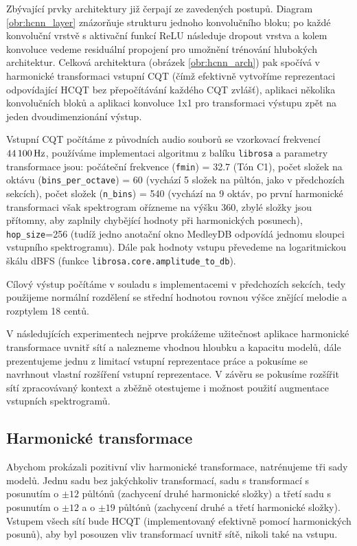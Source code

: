 Zbývající prvky architektury již čerpají ze zavedených postupů. Diagram \ref{obr:hcnn_layer} znázorňuje strukturu jednoho konvolučního bloku; po každé konvoluční vrstvě s aktivační funkcí ReLU následuje dropout vrstva a kolem konvoluce vedeme residuální propojení pro umožnění trénování hlubokých architektur. Celková architektura (obrázek \ref{obr:hcnn_arch}) pak spočívá v harmonické transformaci vstupní CQT (čímž efektivně vytvoříme reprezentaci odpovídající HCQT bez přepočítávání každého CQT zvlášť), aplikaci několika konvolučních bloků a aplikaci konvoluce 1x1 pro transformaci výstupu zpět na jeden dvoudimenzionání výstup.

Vstupní CQT počítáme z původních audio souborů se vzorkovací frekvencí $44\,100\,\rm Hz$, používáme implementaci algoritmu z balíku \texttt{librosa} a parametry transformace jsou: počáteční frekvence (\texttt{fmin}) = 32.7 (Tón C1), počet složek na oktávu (\texttt{bins\_per\_octave}) = 60 (vychází 5 složek na půltón, jako v předchozích sekcích), počet složek (\texttt{n\_bins}) = 540 (vychází na 9 oktáv, po první harmonické transformaci však spektrogram ořízneme na výšku 360, zbylé složky jsou přítomny, aby zaplnily chybějící hodnoty při harmonických posunech), \texttt{hop\_size}=256 (tudíž jedno anotační okno MedleyDB odpovídá jednomu sloupci vstupního spektrogramu). Dále pak hodnoty vstupu převedeme na logaritmickou škálu dBFS (funkce \texttt{librosa.core.amplitude\_to\_db}). 

Cílový výstup počítáme v souladu s implementacemi v předchozích sekcích, tedy použijeme normální rozdělení se střední hodnotou rovnou výšce znějící melodie a rozptylem 18 centů.

V následujících experimentech nejprve prokážeme užitečnost aplikace harmonické transformace uvnitř sítí a nalezneme vhodnou hloubku a kapacitu modelů, dále prezentujeme jednu z limitací vstupní reprezentace práce \cite{Bittner2017} a pokusíme se navrhnout vlastní rozšíření vstupní reprezentace. V závěru se pokusíme rozšířit sítí zpracovávaný kontext a zběžně otestujeme i možnost použití augmentace vstupních spektrogramů.

\subsection{Harmonické transformace}

Abychom prokázali pozitivní vliv harmonické transformace, natrénujeme tři sady modelů. Jednu sadu bez jakýchkoliv transformací, sadu s transformací s posunutím o $\pm 12$ půltónů (zachycení druhé harmonické složky) a třetí sadu s posunutím o $\pm 12$ a o $\pm 19$ půltónů (zachycení druhé a třetí harmonické složky). Vstupem všech sítí bude HCQT (implementovaný efektivně pomocí harmonických posunů), aby byl posouzen vliv transformací uvnitř sítě, nikoli také na vstupu.


